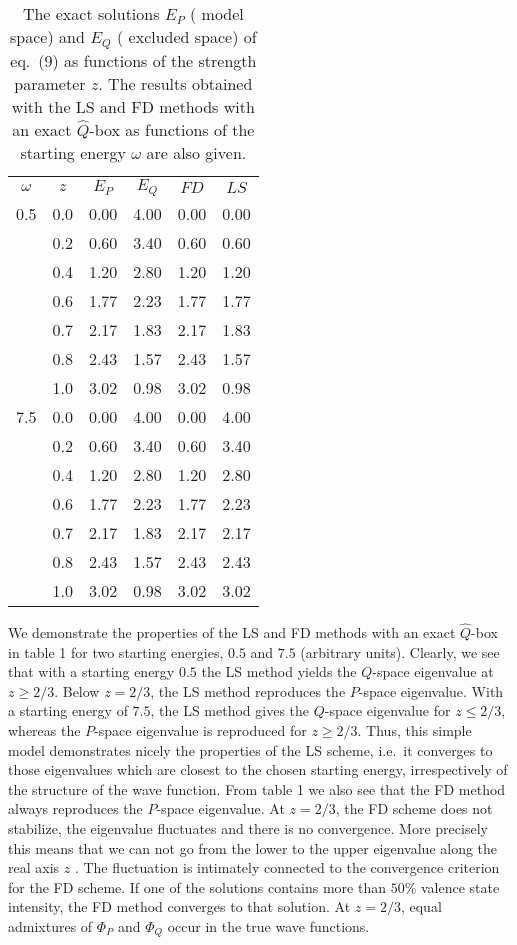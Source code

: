 \begin{table}[hbtp]
\begin{center}
\caption{The exact solutions $E_P$ ( model space) and 
$E_Q$ ( excluded space) of eq.\ (9) 
as functions of the strength parameter $z$.
The results obtained with the LS and FD methods with an
exact $\hat{Q}$-box as functions
of the starting energy $\omega$ are also given.}
\begin{tabular}{rrrrrr}
&&&&&\\\hline
\multicolumn{1}{c}{$\omega$}&
\multicolumn{1}{c}{$z$}&
\multicolumn{1}{c}{$E_P$}&
\multicolumn{1}{c}{$E_Q$}&
\multicolumn{1}{c}{$FD$}&
\multicolumn{1}{c}{$LS$}\\
\hline
0.5&0.0&0.00&4.00&0.00&0.00\\
   &0.2&0.60&3.40&0.60&0.60\\
   &0.4&1.20&2.80&1.20&1.20\\
   &0.6&1.77&2.23&1.77&1.77\\
   &0.7&2.17&1.83&2.17&1.83\\
   &0.8&2.43&1.57&2.43&1.57\\
   &1.0&3.02&0.98&3.02&0.98\\
7.5&0.0&0.00&4.00&0.00&4.00\\
   &0.2&0.60&3.40&0.60&3.40\\
   &0.4&1.20&2.80&1.20&2.80\\
   &0.6&1.77&2.23&1.77&2.23\\
   &0.7&2.17&1.83&2.17&2.17\\
   &0.8&2.43&1.57&2.43&2.43\\
   &1.0&3.02&0.98&3.02&3.02\\
   \hline 
\end{tabular}
\end{center} \label{tab:table1}
\end{table}
We demonstrate the properties of the LS and FD methods with an
exact $\hat{Q}$-box in table 1 for two starting energies,
$0.5$ and $7.5$ (arbitrary units). Clearly, we see that with a starting 
energy $0.5$ the LS method yields the $Q$-space eigenvalue at $z\geq 2/3$.
Below $z=2/3$, the LS method reproduces the $P$-space eigenvalue. 
With a starting energy of $7.5$, the LS method 
gives the $Q$-space eigenvalue
for $z\leq 2/3$, whereas the $P$-space eigenvalue is reproduced for
$z\geq 2/3$. Thus, this simple model demonstrates nicely the properties of
the LS scheme, i.e.\ it converges to those eigenvalues which are
closest to the chosen starting energy, irrespectively of the structure of
the wave function. From table 1 we also see that the FD 
method always reproduces the $P$-space eigenvalue. 
At $z=2/3$, the FD
scheme does not stabilize, the eigenvalue fluctuates and there is
no convergence. More precisely this means that we can not
go from the lower to the upper
eigenvalue along the real axis $z$ \cite{eo77}.
The fluctuation is intimately connected to the convergence
criterion for the FD scheme. If one of the solutions contains
more than $50\%$ valence state intensity, the FD method converges
to that solution. At $z=2/3$, equal admixtures of $\Phi_P$
and $\Phi_Q$ occur in the true wave functions.


